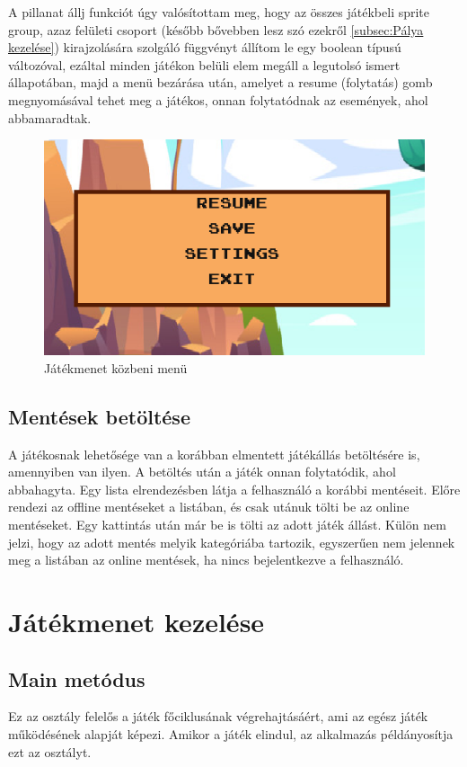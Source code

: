 A pillanat állj funkciót úgy valósítottam meg, hogy az összes játékbeli sprite group, azaz felületi csoport (később bővebben lesz szó ezekről \ref{subsec:Pálya kezelése}) kirajzolására szolgáló függvényt állítom le egy boolean típusú változóval, ezáltal minden játékon belüli elem megáll a legutolsó ismert állapotában, majd a menü bezárása után, amelyet a resume (folytatás) gomb megnyomásával tehet meg a játékos, onnan folytatódnak az események, ahol abbamaradtak.


\begin{figure}[H]
    \centering
    \includegraphics[width=12.0truecm]{images/ingamemenu.png}
    \caption{Játékmenet közbeni menü}
    \label{fig:Játékmenet közbeni menü}
\end{figure}

\subsection{Mentések betöltése}
 A játékosnak lehetősége van a korábban elmentett játékállás betöltésére is, amennyiben van ilyen. A betöltés után a játék onnan folytatódik, ahol abbahagyta. Egy lista elrendezésben látja a felhasználó a korábbi mentéseit. Előre rendezi az offline mentéseket a listában, és csak utánuk tölti be az online mentéseket. Egy kattintás után már be is tölti az adott játék állást. Külön nem jelzi, hogy az adott mentés melyik kategóriába tartozik, egyszerűen nem jelennek meg a listában az online mentések, ha nincs bejelentkezve a felhasználó.

\section{Játékmenet kezelése}

\subsection{Main metódus}
 Ez az osztály felelős a játék főciklusának végrehajtásáért, ami az egész játék működésének alapját képezi. Amikor a játék elindul, az alkalmazás példányosítja ezt az osztályt.

